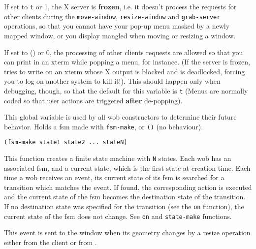         

If set to \verb"t" or 1, the X server is {\bf frozen}, i.e. it doesn't
process the requests for other clients during the \verb"move-window",
\verb"resize-window" and \verb"grab-server" operations, so that you cannot
have your pop-up menu masked by a newly mapped window, or you display
mangled when moving or resizing a window.

If set to () or 0, the processing of other clients requests are allowed so
that you can print in an xterm while popping a menu, for instance. (If the
server is frozen, {\GWM} tries to write on an xterm whose X output is blocked
and {\GWM} is deadlocked, forcing you to log on another system to kill it!).
This should happen only when debugging, though, so that the default for this
variable is \verb"t" (Menus are normally coded so that user actions are
triggered {\bf after} de-popping).

        

This global variable is used by all wob constructors to determine their future
behavior. Holds a fsm made with \verb"fsm-make", or \verb"()" (no behaviour).

        
{\usagefont\begin{verbatim}
(fsm-make state1 state2 ... stateN)
\end{verbatim}}\usageupspace

This function creates a finite state machine with {\tt N} states. Each wob
has an associated fsm, and a current state, which is the first state at
creation time. Each time a wob receives an event, its current state of its
fsm is searched for a transition which matches the event. If found, the
corresponding action is executed and the current state of the fsm becomes
the destination state of the transition. If no destination state was
specified for the transition (see the \verb"on" function), the current state
of the fsm does not change. See \verb"on" and \verb"state-make" functions.

        

This event is sent to the window when its geometry changes by a resize
operation either from the client or from {\GWM}.

